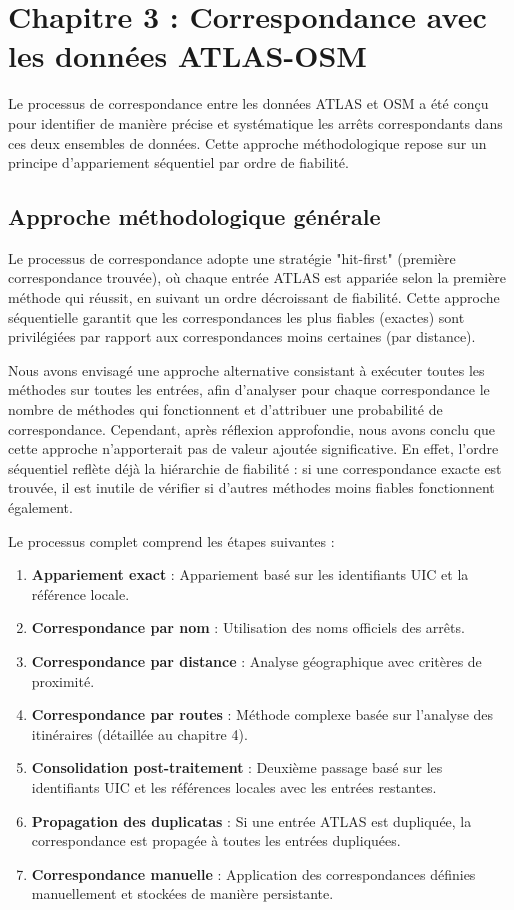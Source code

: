 \chapter{Chapitre 3 : Correspondance avec les données ATLAS-OSM}

Le processus de correspondance entre les données ATLAS et OSM a été conçu pour identifier de manière précise et systématique les arrêts correspondants dans ces deux ensembles de données. Cette approche méthodologique repose sur un principe d'appariement séquentiel par ordre de fiabilité.

\section{Approche méthodologique générale}

Le processus de correspondance adopte une stratégie "hit-first" (première correspondance trouvée), où chaque entrée ATLAS est appariée selon la première méthode qui réussit, en suivant un ordre décroissant de fiabilité. Cette approche séquentielle garantit que les correspondances les plus fiables (exactes) sont privilégiées par rapport aux correspondances moins certaines (par distance).

Nous avons envisagé une approche alternative consistant à exécuter toutes les méthodes sur toutes les entrées, afin d'analyser pour chaque correspondance le nombre de méthodes qui fonctionnent et d'attribuer une probabilité de correspondance. Cependant, après réflexion approfondie, nous avons conclu que cette approche n'apporterait pas de valeur ajoutée significative. En effet, l'ordre séquentiel reflète déjà la hiérarchie de fiabilité : si une correspondance exacte est trouvée, il est inutile de vérifier si d'autres méthodes moins fiables fonctionnent également.

Le processus complet comprend les étapes suivantes :
\begin{enumerate}
    \item \textbf{Appariement exact} : Appariement basé sur les identifiants UIC et la référence locale.
    \item \textbf{Correspondance par nom} : Utilisation des noms officiels des arrêts.
    \item \textbf{Correspondance par distance} : Analyse géographique avec critères de proximité.
    \item \textbf{Correspondance par routes} : Méthode complexe basée sur l'analyse des itinéraires (détaillée au chapitre 4).
    \item \textbf{Consolidation post-traitement} : Deuxième passage basé sur les identifiants UIC et les références locales avec les entrées restantes.
    \item \textbf{Propagation des duplicatas} : Si une entrée ATLAS est dupliquée, la correspondance est propagée à toutes les entrées dupliquées.
    \item \textbf{Correspondance manuelle} : Application des correspondances définies manuellement et stockées de manière persistante.
\end{enumerate}

